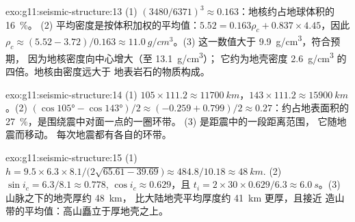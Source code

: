 \begin{solution}{exo:g11:seismic-structure:13}
(1) $(3480/6371)^3 \approx 0.163$：地核约占地球体积的 \qty{16}{\percent}。
(2) 平均密度是按体积加权的平均值：$5.52 = 0.163
\rho_c + 0.837 \times 4.45$，因此 $\rho_c \approx (5.52 - 3.72)/0.163 \approx
\qty{11.0}{g/cm^3}$。(3) 这一数值大于 \qty{9.9}{g/cm^3}，符合预期，
因为地核密度向中心增大（至 \qty{13.1}{g/cm^3}）；
它约为地壳密度
\qty{2.6}{g/cm^3} 的四倍。地核由密度远大于
地表岩石的物质构成。
\end{solution}

\begin{solution}{exo:g11:seismic-structure:14}
(1) $105 \times 111.2 \approx \qty{11700}{km}$，$143 \times 111.2 \approx
\qty{15900}{km}$。(2) $(\cos\ang{105} - \cos\ang{143})/2 \approx (-0.259 +
0.799)/2 \approx 0.27$：约占地表面积的 \qty{27}{\percent}，是围绕震中对面一点的一圈环带。
(3) 是距震中的一段距离范围，
它随地震而移动。
每次地震都有各自的环带。
\end{solution}

\begin{solution}{exo:g11:seismic-structure:15}
(1) $h = 9.5 \times 6.3 \times 8.1/\bigl(2\sqrt{65.61 - 39.69}\bigr) \approx
484.8/10.18 \approx \qty{48}{km}$. (2) $\sin i_c = 6.3/8.1 \approx 0.778$,
$\cos i_c \approx 0.629$，且 $t_i = 2 \times 30 \times 0.629/6.3 \approx
\qty{6.0}{s}$。(3) 山脉之下的地壳厚约 \qty{48}{km}，
比大陆地壳平均厚度约 \qty{41}{km} 更厚，且接近
造山带的平均值：高山矗立于厚地壳之上。
\end{solution}


